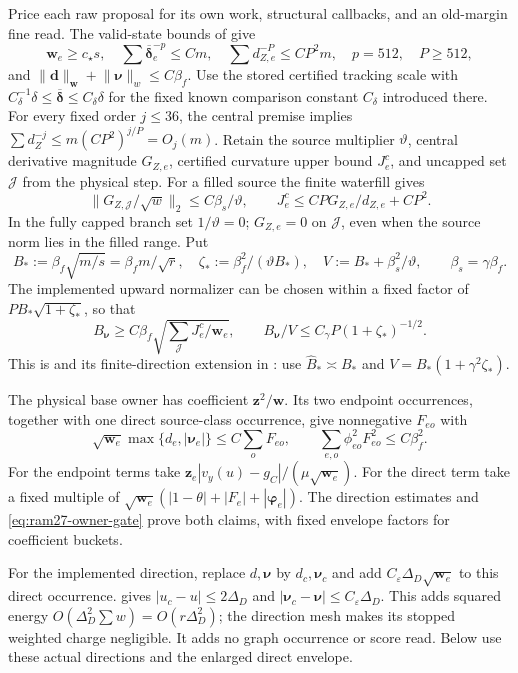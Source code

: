 \documentclass[11pt]{article}
\theoremstyle{remark}
\newcommand{\ww}{\mathbf w}
\newcommand{\zz}{\mathbf z}
\newcommand{\dd}{\mathbf d}
\newcommand{\nnu}{\boldsymbol{\nu}}
\newcommand{\pphi}{\boldsymbol{\varphi}}
\newcommand{\ddeltabar}{\overline{\boldsymbol{\delta}}}
\newcommand{\norm}[1]{\lVert#1\rVert}
\begin{document}
Price each raw proposal for its own work, structural callbacks, and an
old-margin fine read.
The valid-state bounds of  give
\[
 \ww_e\ge c_\star s,\quad
 \sum\ddeltabar_e^{-p}\le Cm,\quad
 \sum d_{Z,e}^{-P}\le CP^2m,\quad p=512,\quad P\ge512,
\]
and $\norm{\dd}_{\ww}+\norm{\nnu}_w\le C\beta_f$.
Use the stored certified tracking scale with
$C_\delta^{-1}\delta\le\ddeltabar\le C_\delta\delta$ for the fixed known
comparison constant $C_\delta$ introduced there.
For every fixed order $j\le36$, the central premise implies $\sum d_Z^{-j}\le
m(CP^2)^{j/P}=O_j(m)$.
Retain the source multiplier $\vartheta$, central derivative magnitude
$G_{Z,e}$, certified curvature upper bound $J_e^c$, and uncapped set $\mathcal
J$ from the physical step.
For a filled source the finite waterfill gives
\[
 \norm{G_{Z,\mathcal J}/\sqrt w}_2\le C\beta_s/\vartheta,
 \qquad J_e^c\le CP G_{Z,e}/d_{Z,e}+CP^2.
\]
In the fully capped branch set $1/\vartheta=0$; $G_{Z,e}=0$ on $\mathcal J$,
even when the source norm lies in the filled range.
Put
\[
 B_*:=\beta_f\sqrt{m/s}=\beta_fm/\sqrt r,\quad
 \zeta_*:=\beta_f^2/(\vartheta B_*),\quad
 V:=B_*+\beta_s^2/\vartheta,
 \qquad \beta_s=\gamma\beta_f.
\]
The implemented upward normalizer can be chosen within a fixed factor of $P
B_*\sqrt{1+\zeta_*}$, so that
\begin{equation}\label{eq:ram27-curvature-normalizer}
 B_{\nnu}\ge C\beta_f\sqrt{\sum_{\mathcal J}J_e^c/\ww_e},
 \qquad B_{\nnu}/V\le C_\gamma P(1+\zeta_*)^{-1/2}.
\end{equation}
This is  and its finite-direction extension in
: use $\widehat B_*\asymp B_*$ and
$V=B_*(1+\gamma^2\zeta_*)$.

The physical base owner has coefficient $\zz^2/\ww$.
Its two endpoint occurrences, together with one direct source-class occurrence,
give nonnegative $F_{eo}$ with
\begin{equation}\label{eq:ram27-physical-envelope}
 \sqrt{\ww_e}\max\{d_e,|\nnu_e|\}\le C\sum_oF_{eo},
 \qquad \sum_{e,o}\phi_{eo}^2F_{eo}^2\le C\beta_f^2.
\end{equation}
For the endpoint terms take $\zz_e|v_y(u)-g_C|/(\mu\sqrt{\ww_e})$.
For the direct term take a fixed multiple of
$\sqrt{\ww_e}(|1-\theta|+|F_e|+|\pphi_e|)$.
The direction estimates and \eqref{eq:ram27-owner-gate} prove both claims, with
fixed envelope factors for coefficient buckets.

For the implemented direction, replace $d,\nnu$ by $d_c,\nnu_c$ and add
$C_\varepsilon\Delta_D\sqrt{\ww_e}$ to this direct occurrence.
 gives $|u_c-u|\le2\Delta_D$ and $|\nnu_c-\nnu|\le
C_\varepsilon\Delta_D$.
This adds squared energy $O(\Delta_D^2\sum w)=O(r\Delta_D^2)$; the direction
mesh makes its stopped weighted charge negligible.
It adds no graph occurrence or score read.
Below use these actual directions and the enlarged direct envelope.
\end{document}
